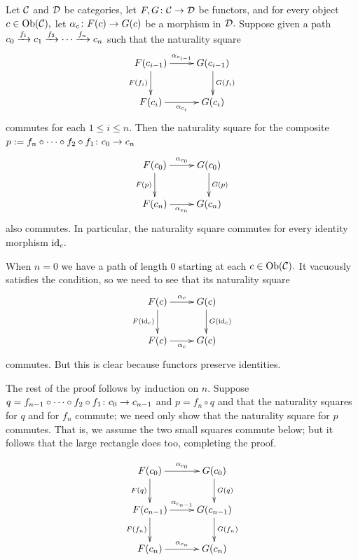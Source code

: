 \documentclass[CT4S-EN-RU]{subfiles}
\begin{document}
\begin{exampleRUS}
\end{exampleRUS}

\begin{lemmaENG}\label{lemma:generators for nattrans}
Let $\mathcal{C}$ and $\mathcal{D}$ be categories, let $F,G\colon\mathcal{C}\rightarrow\mathcal{D}$ be functors, and for every object $c\in\textnormal{Ob}(\mathcal{C}),$ let $\alpha_c\colon F(c)\rightarrow G(c)$ be a morphism in $\mathcal{D}.$ Suppose given a path $c_0\xrightarrow{f_1}c_1\xrightarrow{f_2}\cdots\xrightarrow{f_n} c_n$ such that the naturality square 
$$
\xymatrix{F(c_{i-1})\ar[d]_{F(f_i)}\ar[r]^{\alpha_{c_{i-1}}}&G(c_{i-1})\ar[d]^{G(f_i)}\\F(c_i)\ar[r]_{\alpha_{c_i}}&G(c_i)
}
$$
commutes for each $1\leq i\leq n.$ Then the naturality square for the composite $p:=f_n\circ\cdots\circ f_2\circ f_1\colon c_0\rightarrow c_n$ 
$$\xymatrix{F(c_0)\ar[r]^{\alpha_{c_0}}\ar[d]_{F(p)}&G(c_0)\ar[d]^{G(p)}\\F(c_n)\ar[r]_{\alpha_{c_n}}&G(c_n)}
$$
also commutes. In particular, the naturality square commutes for every identity morphism $\textnormal{id}_c.$
\end{lemmaENG}

\begin{lemmaRUS}\label{lemma:generators for nattrans}
\end{lemmaRUS}

\begin{proofENG}
When $n=0$ we have a path of length 0 starting at each $c\in\textnormal{Ob}(\mathcal{C}).$ It vacuously satisfies the condition, so we need to see that its naturality square 
$$\xymatrix{F(c)\ar[r]^{\alpha_c}\ar[d]_{F(\id_c)}&G(c)\ar[d]^{G(\id_c)}\\F(c)\ar[r]_{\alpha_c}&G(c)}
$$
commutes. But this is clear because functors preserve identities. 

The rest of the proof follows by induction on $n.$ Suppose $q=f_{n-1}\circ\cdots\circ f_2\circ f_1\colon c_0\rightarrow c_{n-1}$ and $p=f_n\circ q$ and that the naturality squares for $q$ and for $f_n$ commute; we need only show that the naturality square for $p$ commutes. That is, we assume the two small squares commute below; but it follows that the large rectangle does too, completing the proof.

$$
\xymatrix{
F(c_0)\ar[r]^{\alpha_{c_0}}\ar[d]_{F(q)}&G(c_0)\ar[d]^{G(q)}\\
F(c_{n-1})\ar[r]^{\alpha_{c_{n-1}}}\ar[d]_{F(f_n)}&G(c_{n-1})\ar[d]^{G(f_n)}\\
F(c_n)\ar[r]^{\alpha_{c_n}}&G(c_n)
}
$$
\end{proofENG}
\end{document}
